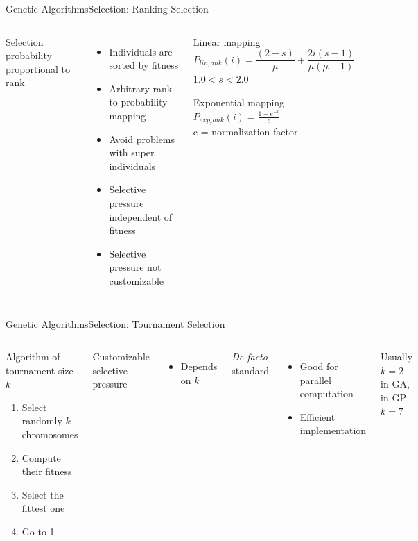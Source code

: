 \documentclass[10pt,compress]{beamer} %
\begin{document}
\begin{frame}{Genetic Algorithms}{Selection: Ranking Selection}
    \begin{columns}
	Selection probability proportional to rank
	\begin{itemize}
		\item Individuals are sorted by fitness
		\item Arbitrary rank to probability mapping
		\item Avoid problems with super individuals
		\item Selective pressure independent of fitness
		\item Selective pressure not customizable
  	\end{itemize}
	\begin{center}
	\small{
	\begin{block}{Linear mapping}
	\begin{equation*}
	P_{lin_rank}(i)=\frac{(2-s)}{\mu} + \frac{2i(s-1)}{\mu (\mu -1)}
	\end{equation*}
	$1.0 < s < 2.0$
	\end{block}

	\begin{block}{Exponential mapping}
	$P_{exp_rank}(i)=\frac{1-e^{-i}}{c}$\\
	c = normalization factor
	\end{block}
	}
	\end{center}
	\end{columns}
\end{frame}

\begin{frame}{Genetic Algorithms}{Selection: Tournament Selection}
    \begin{columns}
	   \begin{block}{Algorithm of tournament size $k$}
	\begin{enumerate}
		\item Select randomly $k$ chromosomes
		\item Compute their fitness
		\item Select the fittest one
		\item Go to 1
  	\end{enumerate}
	\end{block}
	Customizable selective pressure
	\begin{itemize}
		\item Depends on $k$
	\end{itemize}
	\textit{De facto} standard
	\begin{itemize}
		\item Good for parallel computation
		\item Efficient implementation
	\end{itemize}
	Usually $k=2$ in GA, in GP $k=7$
	\end{columns}
\end{frame}
\end{document}
